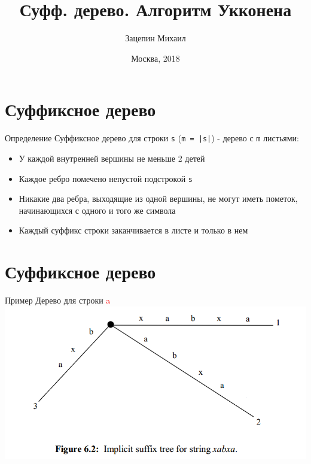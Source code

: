 \documentclass[10pt]{beamer}
\title[\href{https://goo.gl/NRgp8K}{https://goo.gl/NRgp8K} (Term 3)]{Суфф. дерево. Алгоритм Укконена}
\author[Зацепин Михаил]{Зацепин Михаил}
\institute[МФТИ] 
{Московский физико-технический институт\\*}
\date{Москва, 2018}
\begin{document}
\begin{frame}
  \titlepage
\end{frame}

\section{Суффиксное дерево}
\begin{frame}[fragile]{Определение}
Суффиксное дерево для строки \texttt{s} (\texttt{m = |s|}) - дерево с \texttt{m} листьями:
\begin{itemize}
\item{У каждой внутренней вершины не меньше 2 детей}
\item{Каждое ребро помечено непустой подстрокой \texttt{s}}
\item{Никакие два ребра, выходящие из одной вершины, не могут иметь пометок, начинающихся с одного и того же символа}
\item{Каждый суффикс строки заканчивается в листе и только в нем}
\end{itemize}
\end{frame}

\section{Суффиксное дерево}
\begin{frame}[fragile]{Пример}
Дерево для строки \textcolor{red}{a}
\includegraphics[scale=0.5]{Term_3/Source/Pictures/Implicit_Suff_Tree.png}
\end{frame}
\end{document}
